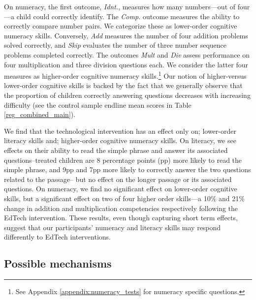 \documentclass[hidelinks,12pt]{article}
\begin{document}
\begin{singlespace}
On numeracy, the first outcome, \textit{Idnt.}, measures how many numbers—out of four—a child could correctly identify. The \textit{Comp.} outcome measures the ability to correctly compare number pairs. We categorize these as lower-order cognitive numeracy skills. Conversely, \textit{Add} measures the number of four addition problems solved correctly, and \textit{Skip} evaluates the number of three number sequence problems completed correctly. The outcomes \textit{Mult} and \textit{Div} assess performance on four multiplication and three division questions each. We consider the latter four measures as higher-order cognitive numeracy skills.\footnote{See Appendix \ref{appendix:numeracy_tests} for numeracy specific questions.} Our notion of higher-versus lower-order cognitive skills is backed by the fact that we generally observe that the proportion of children correctly answering questions decreases with increasing difficulty (see the control sample endline mean scores in Table \ref{reg_combined_main}).

We find that the technological intervention has an effect only on; lower-order literacy skills and; higher-order cognitive numeracy skills. On literacy, we see effects on their ability to read the simple phrase and answer its associated questions–treated children are 8 percentage points (pp) more likely to read the simple phrase, and 9pp and 7pp  more likely to correctly answer the two questions related to the passage– but no effect on the longer passage or its associated questions. On numeracy, we find no significant effect on lower-order cognitive skills, but a significant effect on two of four higher order skills—a 10\% and 21\% change in addition and multiplication competencies respectively following the EdTech intervention. These results, even though capturing short term effects, suggest that our participants' numeracy and literacy skills may respond differently to EdTech interventions. 

\subsection{Possible mechanisms} %

\end{singlespace}
\end{document}
